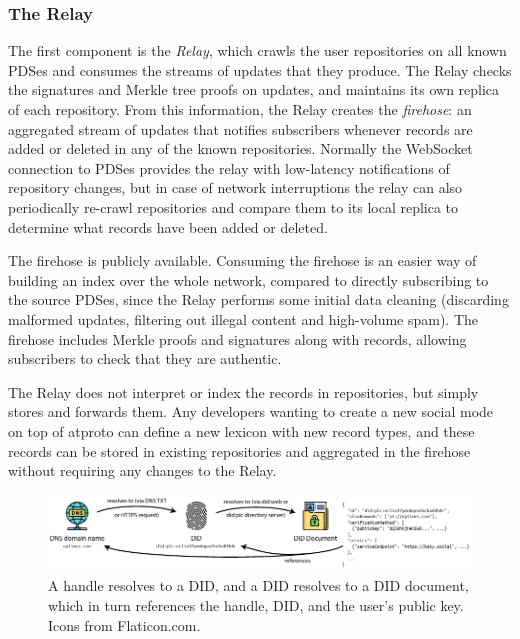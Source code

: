 \documentclass[sigconf]{acmart}
\begin{document}
\subsubsection{The Relay}\label{sec:relay}

The first component is the \emph{Relay}, which crawls the user repositories on all known PDSes and consumes the streams of updates that they produce.
The Relay checks the signatures and Merkle tree proofs on updates, and maintains its own replica of each repository.
From this information, the Relay creates the \emph{firehose}: an aggregated stream of updates that notifies subscribers whenever records are added or deleted in any of the known repositories.
Normally the WebSocket connection to PDSes provides the relay with low-latency notifications of repository changes, but in case of network interruptions the relay can also periodically re-crawl repositories and compare them to its local replica to determine what records have been added or deleted.

The firehose is publicly available.
Consuming the firehose is an easier way of building an index over the whole network, compared to directly subscribing to the source PDSes, since the Relay performs some initial data cleaning (discarding malformed updates, filtering out illegal content and high-volume spam).
The firehose includes Merkle proofs and signatures along with records, allowing subscribers to check that they are authentic.

The Relay does not interpret or index the records in repositories, but simply stores and forwards them.
Any developers wanting to create a new social mode on top of atproto can define a new lexicon with new record types, and these records can be stored in existing repositories and aggregated in the firehose without requiring any changes to the Relay.

\begin{figure}
    \centering
    \includegraphics[width=\linewidth]{identity.pdf}
    \caption{A handle resolves to a DID, and a DID resolves to a DID document, which in turn references the handle, DID, and the user's public key. Icons from Flaticon.com.}
    \label{fig:identity}
\end{figure}
\end{document}
